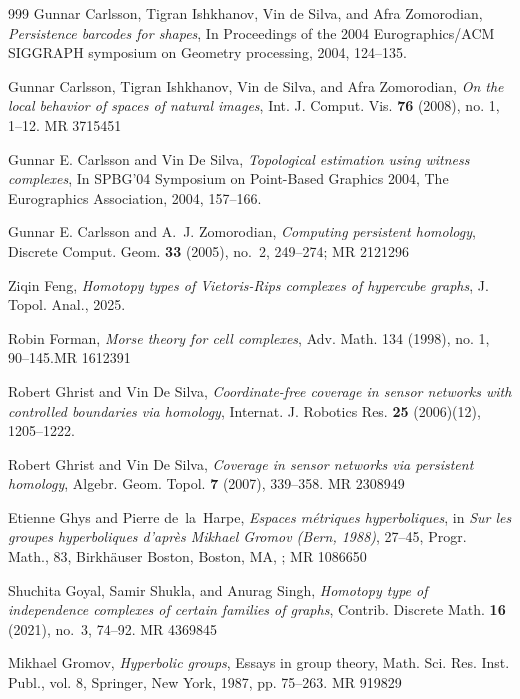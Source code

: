 \documentclass{amsart}
\theoremstyle{definition}
\theoremstyle{remark}
\numberwithin{equation}{section}
\begin{document}
{\begin{thebibliography}{999}
Gunnar Carlsson, Tigran Ishkhanov, Vin de Silva, and Afra Zomorodian, {\em Persistence
barcodes for shapes}, In Proceedings of the 2004 Eurographics/ACM SIGGRAPH symposium on Geometry processing, 2004, 124--135.

Gunnar Carlsson, Tigran Ishkhanov, Vin de Silva, and Afra Zomorodian, {\em On the local
behavior of spaces of natural images}, Int. J. Comput. Vis. {\bf 76} (2008), no. 1, 1--12. MR 3715451


 Gunnar E. Carlsson and Vin De Silva, {\em Topological estimation using witness complexes}, In SPBG’04 Symposium on Point-Based Graphics 2004, The Eurographics Association, 2004, 157--166.

 Gunnar E.  Carlsson and A.~J. Zomorodian, {\em Computing persistent homology}, Discrete Comput. Geom. {\bf 33} (2005), no.~2, 249--274; MR 2121296

Ziqin Feng, {\em Homotopy types of Vietoris-Rips complexes of hypercube graphs}, J. Topol. Anal., 2025.

Robin Forman, {\em Morse theory for cell complexes}, Adv. Math. 134 (1998), no. 1, 90--145.MR 1612391 

 Robert Ghrist and Vin De Silva, {\em Coordinate-free coverage in sensor networks with controlled boundaries via homology}, Internat. J. Robotics Res. {\bf 25} (2006)(12), 1205--1222.

Robert Ghrist and Vin De Silva, {\em Coverage in sensor networks via persistent homology}, Algebr. Geom. Topol. {\bf 7} (2007), 339--358. MR 2308949

 Etienne Ghys and Pierre de~la~Harpe, {\em Espaces m\'etriques hyperboliques}, in {\it Sur les groupes hyperboliques d'apr\`es Mikhael Gromov (Bern, 1988)}, 27--45, Progr. Math., 83, Birkh\"auser Boston, Boston, MA, ; MR 1086650

Shuchita Goyal, Samir Shukla, and Anurag Singh, {\em Homotopy type of independence complexes of certain families of graphs}, Contrib. Discrete Math. {\bf 16} (2021), no.~3, 74--92. MR 4369845



Mikhael Gromov, {\em Hyperbolic groups}, Essays in group theory, Math. Sci. Res. Inst. Publ., vol. 8, Springer, New York, 1987, pp. 75--263.  MR 919829


\end{thebibliography}}
\end{document}
